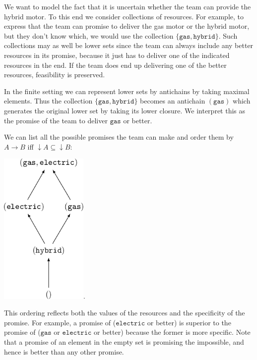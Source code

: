 \documentclass[12pt]{article}
\theoremstyle{definition}
\theoremstyle{plain}
\theoremstyle{plain}
\theoremstyle{plain}
\theoremstyle{plain}
\theoremstyle{remark}
\theoremstyle{remark}
\newcommand{\sub}{\subseteq}
\begin{document}
We want to model the fact that it is uncertain whether the team can provide the hybrid motor. To this end we consider collections of resources. For example, to express that the team can promise to deliver the gas motor or the hybrid motor, but they don't know which, we would use the collection $\{\mathtt{gas},\mathtt{hybrid}\}$. Such collections may as well be lower sets since the team can always include any better resources in its promise, because it just has to deliver one of the indicated resources in the end. If the team does end up delivering one of the better resources, feasibility is preserved.

In the finite setting we can represent lower sets by antichains by taking maximal elements. Thus the collection $\{\mathtt{gas},\mathtt{hybrid}\}$ becomes an antichain $(\mathtt{gas})$ which generates the original lower set by taking its lower closure. We interpret this as the promise of the team to deliver $\mathtt{gas}$ or better.

We can list all the possible promises the team can make and order them by $A \rightarrow B$ iff $\downarrow A \sub \downarrow B$:
\begin{center}
	\includegraphics[width=120pt]{section6/6.1/anti_motors.png}.
\end{center}
This ordering reflects both the values of the resources and the specificity of the promise. For example, a promise of ($\mathtt{electric}$ or better) is superior to the promise of ($\mathtt{gas}$ or $\mathtt{electric}$ or better) because the former is more specific. Note that a promise of an element in the empty set is promising the impossible, and hence is better than any other promise.
\end{document}

